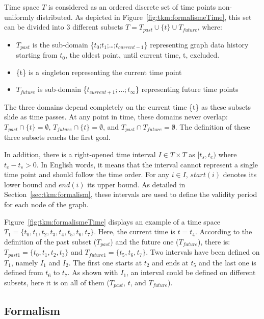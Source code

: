 Time space $T$ is considered as an ordered discrete set of time points non-uniformly distributed. 
As depicted in Figure~\ref{fig:tkm:formalismeTime}, this set can be divided into 3 different subsets $T = T_{past} \cup \{t\} \cup T_{future}$, where:  
\begin{itemize}
	\item $T_{past}$ is the sub-domain \{$t_{0}$;$t_{1}$;\ldots;$t_{current-1}$\}  representing graph data history starting from $t_0$, the oldest point, until current time, t, excluded.
	\item \{t\} is a singleton representing the current time 
point
	\item $T_{future}$ is sub-domain \{$t_{current+1};\ldots;t_{\infty}$\} representing future time points 
\end{itemize}
The three domains depend completely on the current time \{t\} as these subsets slide as time passes. 
At any point in time, these domains never overlap: $T_{past} \cap \{t\} = \emptyset$, $T_{future} \cap \{t\} =  \emptyset$, and $T_{past} \cap T_{future} = \emptyset$.
The definition of these three subsets reachs the first goal.

In addition, there is a right-opened time interval $I \in T \times T$ as $[t_s, t_e)$ where $t_e - t_s > 0$.
In English words, it means that the interval cannot represent a single time point and should follow the time order. 
For any $i \in I$, $start(i)$ denotes its lower bound and $end(i)$ its upper bound.
As detailed in Section~\ref{sec:tkm:formalism}, these intervals are used to define the validity period for each node of the graph. 

Figure~\ref{fig:tkm:formalismeTime} displays an example of a time space $T_1 = \{t_0, t_1, t_2, t_3, t_4, t_5, t_6, t_7\}$.
Here, the current time is $t = t_4$.
According to the definition of the past subset ($T_{past}$) and the future one ($T_{future}$), there is: $T_{past1} =  \{t_0, t_1, t_2, t_3\}$ and $T_{future1} = \{t_5, t_6, t_7\}$.
Two intervals have been defined on $T_1$, namely $I_1$ and $I_2$.
The first one starts at $t_2$ and ends at $t_5$ and the last one is defined from $t_6$ to $t_7$.
As shown with $I_1$, an interval could be defined on different subsets, here it is on all of them ($T_{past}$, $t$, and $T_{future}$).

\subsection{Formalism}
\label{sec:tkm:k-formalism:formalism}
 
